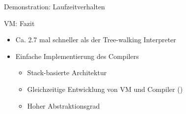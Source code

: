 \begin{frame}{Demonstration: Laufzeitverhalten}
	\begin{figure}[H]
		\href{run:assets/01_rush_presentation_vm.mkv}{
		}
	\end{figure}
\end{frame}

\begin{frame}{VM: Fazit}
	\begin{itemize}
		\item<1-> Ca. 2.7 mal schneller als der Tree-walking Interpreter
		\item<2-> Einfache Implementierung des Compilers
			\begin{itemize}
				\item<3-> Stack-basierte Architektur
				\item<4-> Gleichzeitige Entwicklung von VM und Compiler ()
				\item<5-> Hoher Abstraktionsgrad
			\end{itemize}
	\end{itemize}
\end{frame}
